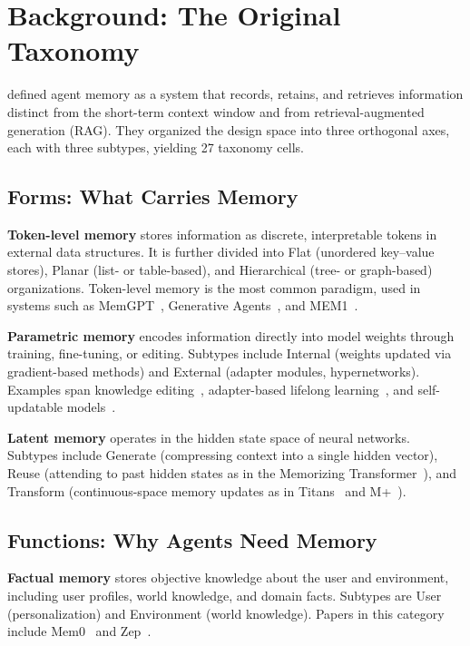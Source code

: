 \section{Background: The Original Taxonomy}
\label{sec:background}

\citet{DBLP:journals/corr/abs-2512-13564} defined agent memory as a system that records, retains, and retrieves information distinct from the short-term context window and from retrieval-augmented generation (RAG). They organized the design space into three orthogonal axes, each with three subtypes, yielding 27 taxonomy cells.

\subsection{Forms: What Carries Memory}

\textbf{Token-level memory} stores information as discrete, interpretable tokens in external data structures. It is further divided into Flat (unordered key--value stores), Planar (list- or table-based), and Hierarchical (tree- or graph-based) organizations. Token-level memory is the most common paradigm, used in systems such as MemGPT~\cite{Unknown2023MemGPT}, Generative Agents~\cite{Unknown2023Generativeagents}, and MEM1~\cite{Unknown2025MEM1}.

\textbf{Parametric memory} encodes information directly into model weights through training, fine-tuning, or editing. Subtypes include Internal (weights updated via gradient-based methods) and External (adapter modules, hypernetworks). Examples span knowledge editing~\cite{Unknown2021EditingFactualKnowle}, adapter-based lifelong learning~\cite{Unknown2013ELLA}, and self-updatable models~\cite{Unknown2024SelfUpdatableLargeLa}.

\textbf{Latent memory} operates in the hidden state space of neural networks. Subtypes include Generate (compressing context into a single hidden vector), Reuse (attending to past hidden states as in the Memorizing Transformer~\cite{Unknown2022MemorizingTransforme}), and Transform (continuous-space memory updates as in Titans~\cite{Unknown2025Titans} and M+~\cite{Unknown2025M}).

\subsection{Functions: Why Agents Need Memory}

\textbf{Factual memory} stores objective knowledge about the user and environment, including user profiles, world knowledge, and domain facts. Subtypes are User (personalization) and Environment (world knowledge). Papers in this category include Mem0~\cite{Unknown2025Mem0} and Zep~\cite{Unknown2025Zep}.


